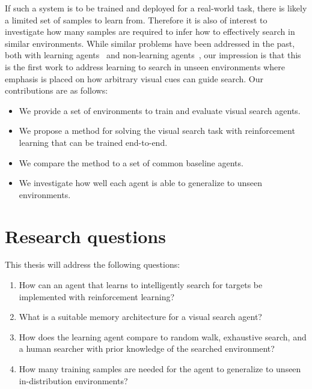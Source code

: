 If such a system is to be trained and deployed for a real-world task, there is likely a limited set of samples to learn from.
Therefore it is also of interest to investigate how many samples are required to infer how to effectively search in similar environments.
While similar problems have been addressed in the past, both with learning agents~\cite{minut_mahadevan_2001,mirowski_navigate_2017,ghesu_artificial_2016,caicedo_active_2015} and non-learning agents~\cite{shubina_visualsearch_2010,forssen_visual_2008}, 
our impression is that this is the first work to address learning to search in unseen environments where emphasis is placed on how arbitrary visual cues can guide search.
Our contributions are as follows:

\begin{itemize}
  \item We provide a set of environments to train and evaluate visual search agents.
  \item We propose a method for solving the visual search task with reinforcement learning that can be trained end-to-end.
  \item We compare the method to a set of common baseline agents.
  \item We investigate how well each agent is able to generalize to unseen environments.
\end{itemize}

\section{Research questions}
\label{sec:research-questions}

This thesis will address the following questions:

\begin{enumerate}
  \item \label{itm:rq1} How can an agent that learns to intelligently search for targets be implemented with reinforcement learning?
  \item What is a suitable memory architecture for a visual search agent?
  \item \label{itm:rq2} How does the learning agent compare to random walk, exhaustive search, and a human searcher with prior knowledge of the searched environment?
  \item \label{itm:rq3} How many training samples are needed for the agent to generalize to unseen in-distribution environments?
\end{enumerate}

